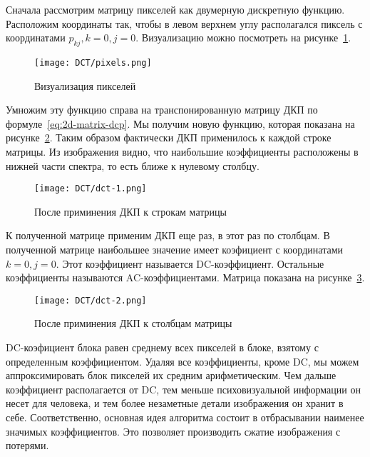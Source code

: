 Сначала рассмотрим матрицу пикселей как двумерную дискретную функцию.
Расположим координаты так, чтобы в левом верхнем углу
располагался пиксель с координатами $p_{kj}, k = 0, j = 0$.
Визуализацию можно посмотреть на рисунке~\ref{img:pixels-dct}.

\begin{figure}[ht!]
    \centering
    \caption{Визуализация пикселей}
    \texttt{[image: DCT/pixels.png]}
    \label{img:pixels-dct}
\end{figure}

Умножим эту функцию справа на транспонированную матрицу ДКП
по формуле~\ref{eq:2d-matrix-dcp}. Мы получим новую функцию,
которая показана на рисунке~\ref{img:dct-1}.
Таким образом фактически ДКП применилось к каждой строке матрицы.
Из изображения видно, что наибольшие коэффициенты расположены
в нижней части спектра, то есть ближе к нулевому столбцу.

\begin{figure}[ht!]
    \centering
    \caption{После приминения ДКП к строкам матрицы}
    \texttt{[image: DCT/dct-1.png]}
    \label{img:dct-1}
\end{figure}

К полученной матрице применим ДКП еще раз, в этот раз по столбцам.
В полученной матрице наибольшее значение имеет коэфициент с координатами
$k = 0, j = 0$. Этот коэффициент называется DC-коэффициент.
Остальные коэффициенты называются AC-коэффициентами.
Матрица показана на рисунке~\ref{img:dct-2}.

\begin{figure}[ht!]
    \centering
    \caption{После приминения ДКП к столбцам матрицы}
    \texttt{[image: DCT/dct-2.png]}
    \label{img:dct-2}
\end{figure}

DC-коэфициент блока равен среднему всех пикселей в блоке,
взятому с определенным коэффициентом. Удаляя все коэффициенты,
кроме DC, мы можем аппроксимировать блок пикселей их средним
арифметическим. Чем дальше коэффициент располагается от DC,
тем меньше психовизуальной информации он несет для человека,
и тем более незаметные детали изображения он хранит в себе.
Соответственно, основная идея алгоритма состоит в отбрасывании
наименее значимых коэффициентов. Это позволяет производить сжатие
изображения с потерями.

